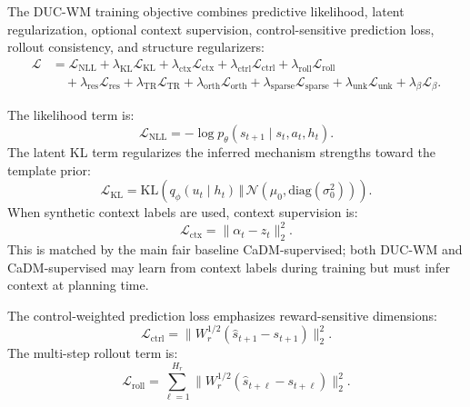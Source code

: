 \documentclass[11pt]{article}
\newcommand{\KL}{\mathrm{KL}}
\newcommand{\diag}{\mathrm{diag}}
\begin{document}
The DUC-WM training objective combines predictive likelihood, latent regularization, optional context supervision, control-sensitive prediction loss, rollout consistency, and structure regularizers:
\begin{align}
    \mathcal{L}
    &=
    \mathcal{L}_{\mathrm{NLL}}
    +
    \lambda_{\mathrm{KL}}\mathcal{L}_{\mathrm{KL}}
    +
    \lambda_{\mathrm{ctx}}\mathcal{L}_{\mathrm{ctx}}
    +
    \lambda_{\mathrm{ctrl}}\mathcal{L}_{\mathrm{ctrl}}
    +
    \lambda_{\mathrm{roll}}\mathcal{L}_{\mathrm{roll}}
    \nonumber \\
    &\quad+
    \lambda_{\mathrm{res}}\mathcal{L}_{\mathrm{res}}
    +
    \lambda_{\mathrm{TR}}\mathcal{L}_{\mathrm{TR}}
    +
    \lambda_{\mathrm{orth}}\mathcal{L}_{\mathrm{orth}}
    +
    \lambda_{\mathrm{sparse}}\mathcal{L}_{\mathrm{sparse}}
    +
    \lambda_{\mathrm{unk}}\mathcal{L}_{\mathrm{unk}}
    +
    \lambda_{\beta}\mathcal{L}_{\beta}.
\end{align}

The likelihood term is:
\begin{equation}
    \mathcal{L}_{\mathrm{NLL}}
    =
    -\log p_\theta(s_{t+1}\mid s_t,a_t,h_t).
\end{equation}
The latent KL term regularizes the inferred mechanism strengths toward the template prior:
\begin{equation}
    \mathcal{L}_{\mathrm{KL}}
    =
    \KL
    \left(
        q_\phi(u_t\mid h_t)
        \,\Vert\,
        \mathcal{N}(\mu_0,\diag(\sigma_0^2))
    \right).
\end{equation}
When synthetic context labels are used, context supervision is:
\begin{equation}
    \mathcal{L}_{\mathrm{ctx}}
    =
    \|\alpha_t - z_t\|_2^2.
\end{equation}
This is matched by the main fair baseline CaDM-supervised; both DUC-WM and CaDM-supervised may learn from context labels during training but must infer context at planning time.

The control-weighted prediction loss emphasizes reward-sensitive dimensions:
\begin{equation}
    \mathcal{L}_{\mathrm{ctrl}}
    =
    \|W_r^{1/2}(\hat s_{t+1}-s_{t+1})\|_2^2.
\end{equation}
The multi-step rollout term is:
\begin{equation}
    \mathcal{L}_{\mathrm{roll}}
    =
    \sum_{\ell=1}^{H_r}
    \|W_r^{1/2}(\hat s_{t+\ell}-s_{t+\ell})\|_2^2.
\end{equation}
\end{document}
